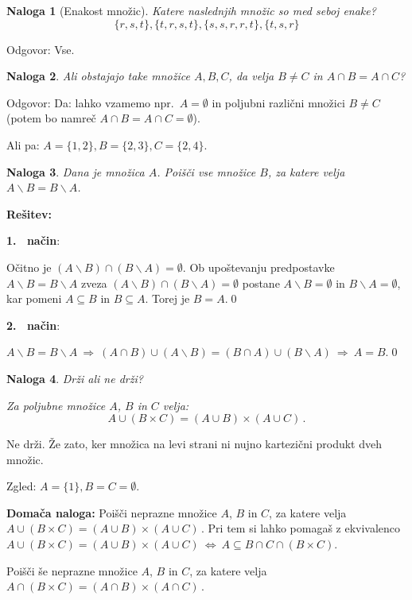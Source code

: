 \documentclass[11pt,paper=b5,footinclude,headinclude]{scrbook} %
\def\sledi {{~\Rightarrow~}}
\def\cee {{~\Leftrightarrow~}}
\newtheorem*{problem}{Naloga}
\begin{document}
\begin{problem}[Enakost množic]
Katere naslednjih množic so med seboj enake?
$$\{r,s,t\}, \{t,r,s,t\}, \{s,s,r,r,t\}, \{t,s,r\}$$
\end{problem}

Odgovor: Vse.

\bigskip
\begin{problem}
Ali obstajajo take množice $A, B, C$, da velja $B\neq C$ in $A\cap B = A\cap C$?
\end{problem}

Odgovor: Da: lahko vzamemo npr.~$A = \emptyset$ in poljubni različni množici $B\neq C$
(potem bo namreč $A\cap B = A\cap C = \emptyset$).

Ali pa: $A = \{1,2\}, B = \{2,3\}, C = \{2,4\}$.


\begin{problem}
Dana je množica $A$. Poišči vse množice $B$, za katere velja
$A\backslash B = B\backslash A$.
\end{problem}

\textbf{Rešitev:}

\textbf{1.~ način}:

Očitno je
$(A\backslash B) \cap (B\backslash A)=\emptyset$.
Ob upoštevanju predpostavke $A\backslash B = B\backslash A$
zveza
$(A\backslash B) \cap (B\backslash A)=\emptyset$
postane
$A\backslash B =\emptyset$
in $B\backslash A =\emptyset$, kar pomeni
$A\subseteq B$ in $B\subseteq A$. Torej je $B = A$.\qed

\textbf{2.~ način}:

$A\backslash B = B\backslash A \sledi(A\cap B)\cup (A\backslash B) = (B\cap A)\cup (B\backslash A) \sledi A = B$.\qed

\begin{problem}
Drži ali ne drži?

Za poljubne množice $A$, $B$ in $C$ velja:
$$A\cup (B\times C) = (A\cup B)\times (A\cup C)\,.$$
\end{problem}

Ne drži. Že zato, ker množica na levi strani ni nujno kartezični produkt dveh množic.

Zgled: $A = \{1\}, B = C = \emptyset$.

\medskip
\textbf{Domača naloga:}
Poišči neprazne množice $A$, $B$ in $C$, za katere velja
$A\cup (B\times C) = (A\cup B)\times (A\cup C)\,.$ Pri tem si lahko pomagaš z ekvivalenco
$A\cup (B\times C) = (A\cup B)\times (A\cup C)\cee A\subseteq B\cap C\cap (B\times C)$.

Poišči še neprazne množice $A$, $B$ in $C$, za katere velja
$A\cap (B\times C) = (A\cap B)\times (A\cap C)\,.$
\end{document}
